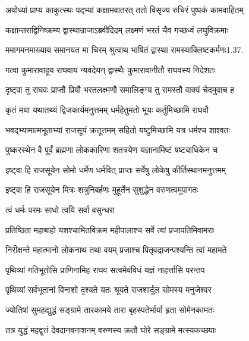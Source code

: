 \twolineshloka
{अयोध्यां प्राप्य काकुत्स्थः पद्भ्यां कक्षामवातरत्}
{ततो विसृज्य रुचिरं पुष्पकं कामवाहितम्}%

\twolineshloka
{कक्षान्तराद्विनिष्क्रम्य द्वास्थान्राजाऽब्रवीदिदम्}
{लक्ष्मणं भरतं चैव गच्छध्वं लघुविक्रमाः}%

\twolineshloka
{ममागमनमाख्याय समानयत मा चिरम्}
{श्रुत्वाथ भाषितं द्वास्था रामस्याक्लिष्टकर्मणः1.37.}%

\twolineshloka
{गत्वा कुमारावाहूय राघवाय न्यवदेयन्}
{द्वास्थैः कुमारावानीतौ राघवस्य निदेशतः}%

\twolineshloka
{दृष्ट्वा तु राघवः प्राप्तौ प्रियौ भरतलक्ष्मणौ}
{समालिङ्ग्य तु रामस्तौ वाक्यं चेदमुवाच ह}%

\twolineshloka
{कृतं मया यथातथ्यं द्विजकार्यमनुत्तमम्}
{धर्महेतुमतो भूयः कर्तुमिच्छामि राघवौ}%

\twolineshloka
{भवद्भ्यामात्मभूताभ्यां राजसूयं क्रतूत्तमम्}
{सहितो यष्टुमिच्छामि यत्र धर्मश्च शाश्वतः}%

\twolineshloka
{पुष्करस्थेन वै पूर्वं ब्रह्मणा लोककारिणा}
{शतत्रयेण यज्ञानामिष्टं षष्ट्याधिकेन च}%

\twolineshloka
{इष्ट्वा हि राजसूयेन सोमो धर्मेण धर्मवित्}
{प्राप्तः सर्वेषु लोकेषु कीर्तिस्थानमनुत्तमम्}%

\twolineshloka
{इष्ट्वा हि राजसूयेन मित्रः शत्रुनिबर्हणः}
{मुहूर्तेन सुशुद्धेन वरुणत्वमुपागतः}%



\onelineshloka
{त्वं धर्मः परमः साधो त्वयि सर्वा वसुन्धरा}%

\twolineshloka
{प्रतिष्ठिता महाबाहो यशश्चामितविक्रम}
{महीपालाश्च सर्वे त्वां प्रजापतिमिवामराः}%

\twolineshloka
{निरीक्षन्ते महात्मानो लोकनाथ तथा वयम्}
{प्रजाश्च पितृवद्राजन्पश्यन्ति त्वां महामते}%

\twolineshloka
{पृथिव्यां गतिभूतोसि प्राणिनामिह राघव}
{सत्वमेवंविधं यज्ञं नाहर्त्तासि परन्तप}%

\twolineshloka
{पृथिव्यां सर्वभूतानां विनाशो दृश्यते यतः}
{श्रूयते राजशार्दूल सोमस्य मनुजेश्वर}%

\twolineshloka
{ज्योतिषां सुमहद्युद्धं सङ्ग्रामे तारकामये}
{तारा बृहस्पतेर्भार्या हृता सोमेनकामतः}%

\twolineshloka
{तत्र युद्धं महद्वृत्तं देवदानवनाशनम्}
{वरुणस्य क्रतौ घोरे सङ्ग्रामे मत्स्यकच्छपाः}%

